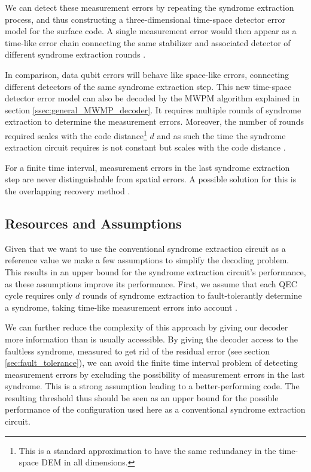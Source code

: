We can detect these measurement errors by repeating the syndrome extraction process, 
and thus constructing a three-dimensional time-space detector error model for the surface code. 
A single measurement error would then appear as a time-like error chain connecting the same stabilizer and associated detector of different syndrome extraction rounds \cite{topological_quantum_memory,manuel_error_propagation_paper}.  

In comparison, data qubit errors will behave like space-like errors, connecting different detectors of the same syndrome extraction step.
This new time-space detector error model can also be decoded by the MWPM algorithm explained in section \ref{ssec:general_MWMP_decoder}.
It requires multiple rounds of syndrome extraction to determine the measurement errors.
Moreover, the number of rounds required scales with the code distance\footnote{
    This is a standard approximation to have the same redundancy in the time-space DEM in all dimensions\cite{mwpm_threshold_paper,topological_quantum_memory,terhal_qec_formalism}. 
    } $d$ and as such the time the syndrome extraction circuit requires 
is not constant but scales with the code distance \cite{topological_quantum_memory,terhal_qec_formalism,gottesmann_book}.

For a finite time interval, measurement errors in the last syndrome extraction step are never distinguishable from spatial errors. 
A possible solution for this is the overlapping recovery method \cite{topological_quantum_memory}.


\subsection{Resources and Assumptions}\label{sssec:assumptions_conv_sec}

Given that we want to use the conventional syndrome extraction circuit as a reference value we make a few assumptions to simplify the decoding problem.
This results in an upper bound for the syndrome extraction circuit's performance, as these assumptions improve its performance.
First, we assume that each QEC cycle requires only $d$ rounds of syndrome extraction 
to fault-tolerantly determine a syndrome, taking time-like measurement errors into account \cite{topological_quantum_memory,terhal_qec_formalism,gottesmann_book}.

We can further reduce the complexity of this approach by giving our decoder more information than is usually accessible. 
By giving the decoder access to the faultless syndrome, measured to get rid of the residual error (see section \ref{sec:fault_tolerance}), 
we can avoid the finite time interval problem of detecting measurement errors by excluding the possibility of measurement errors in the last syndrome. 
This is a strong assumption leading to a better-performing code. 
The resulting threshold thus should be seen as an upper bound for the possible performance of the configuration used here as a conventional syndrome extraction circuit. 
 
